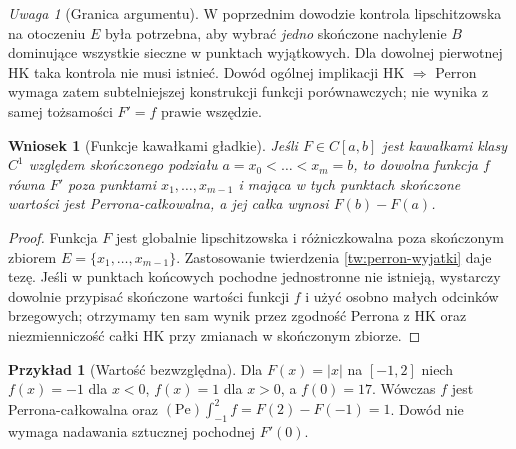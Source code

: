 \documentclass[11pt,a4paper]{article}
\numberwithin{equation}{section}
\theoremstyle{plain}
\newtheorem{wniosek}[twierdzenie]{Wniosek}
\theoremstyle{definition}
\newtheorem{przyklad}[twierdzenie]{Przykład}
\theoremstyle{remark}
\newtheorem{uwaga}[twierdzenie]{Uwaga}
\begin{document}
\begin{uwaga}[Granica argumentu]
W poprzednim dowodzie kontrola lipschitzowska na otoczeniu $E$ była potrzebna, aby wybrać \emph{jedno} skończone nachylenie $B$ dominujące wszystkie sieczne w punktach wyjątkowych. Dla dowolnej pierwotnej HK taka kontrola nie musi istnieć. Dowód ogólnej implikacji HK $\Rightarrow$ Perron wymaga zatem subtelniejszej konstrukcji funkcji porównawczych; nie wynika z samej tożsamości $F'=f$ prawie wszędzie.
\end{uwaga}
\begin{wniosek}[Funkcje kawałkami gładkie]\label{wn:perron-kawalkami}
Jeśli $F\in C[a,b]$ jest kawałkami klasy $C^1$ względem skończonego podziału $a=x_0<\dots<x_m=b$, to dowolna funkcja $f$ równa $F'$ poza punktami $x_1,\dots,x_{m-1}$ i mająca w tych punktach skończone wartości jest Perrona-całkowalna, a jej całka wynosi $F(b)-F(a)$.
\end{wniosek}
\begin{proof}
Funkcja $F$ jest globalnie lipschitzowska i różniczkowalna poza skończonym zbiorem $E=\{x_1,\ldots,x_{m-1}\}$. Zastosowanie twierdzenia \ref{tw:perron-wyjatki} daje tezę. Jeśli w punktach końcowych pochodne jednostronne nie istnieją, wystarczy dowolnie przypisać skończone wartości funkcji $f$ i użyć osobno małych odcinków brzegowych; otrzymamy ten sam wynik przez zgodność Perrona z HK oraz niezmienniczość całki HK przy zmianach w skończonym zbiorze.
\end{proof}
\begin{przyklad}[Wartość bezwzględna]
Dla $F(x)=|x|$ na $[-1,2]$ niech $f(x)=-1$ dla $x<0$, $f(x)=1$ dla $x>0$, a $f(0)=17$. Wówczas $f$ jest Perrona-całkowalna oraz $(\mathrm{Pe})\int_{-1}^{2}f=F(2)-F(-1)=1$. Dowód nie wymaga nadawania sztucznej pochodnej $F'(0)$.
\end{przyklad}
\end{document}
